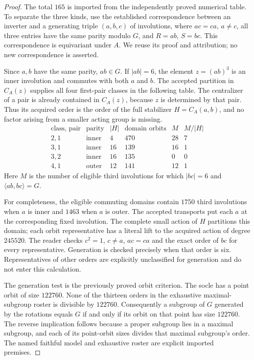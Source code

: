 \documentclass[11pt]{article}
\begin{document}
\begin{proof}
The total $165$ is imported from the independently proved numerical
table. To separate the three kinds, use the established correspondence
between an inverter and a generating triple $(a,b,c)$ of involutions,
where $ac=ca$, $a\ne c$, all three entries have the same parity modulo
$G$, and $R=ab$, $S=bc$. This correspondence is equivariant under $A$.
We reuse its proof and attribution; no new correspondence is asserted.

Since $a,b$ have the same parity, $ab\in G$. If $|ab|=6$, the element
$z=(ab)^3$ is an inner involution and commutes with both $a$ and $b$.
The accepted partition in $C_A(z)$ supplies all four first-pair classes
in the following table. The centralizer of a pair is already contained
in $C_A(z)$, because $z$ is determined by that pair. Thus its acquired
order is the order of the full stabilizer $H=C_A(a,b)$, and no factor
arising from a smaller acting group is missing.
\[
\begin{array}{c|c|r|r|r|r}
\text{class, pair}&\text{parity}&|H|&\text{domain orbits}&M&M/|H|\\\hline
2,1&\text{inner}&4&470&28&7\\
3,1&\text{inner}&16&139&16&1\\
3,2&\text{inner}&16&135&0&0\\
4,1&\text{outer}&12&141&12&1
\end{array}
\]
Here $M$ is the number of eligible third involutions for which
$|bc|=6$ and $\langle ab,bc\rangle=G$.

For completeness, the eligible commuting domains contain $1750$
third involutions when $a$ is inner and $1463$ when $a$ is outer.
The accepted transports put each $a$ at the corresponding fixed
involution. The complete small action of $H$ partitions this domain;
each orbit representative has a literal lift to the acquired action
of degree $245520$. The reader checks $c^2=1$, $c\ne a$, $ac=ca$
and the exact order of $bc$ for every representative. Generation is
checked precisely when that order is six. Representatives of other
orders are explicitly unclassified for generation and do not enter
this calculation.

The generation test is the previously proved orbit criterion. The
socle has a point orbit of size $122760$. None of the thirteen orders
in the exhaustive maximal-subgroup roster is divisible by $122760$.
Consequently a subgroup of $G$ generated by the rotations equals $G$
if and only if its orbit on that point has size $122760$. The reverse
implication follows because a proper subgroup lies in a maximal
subgroup, and each of its point-orbit sizes divides that maximal
subgroup's order. The named faithful model and exhaustive roster are
explicit imported premises.


\end{proof}
\end{document}
